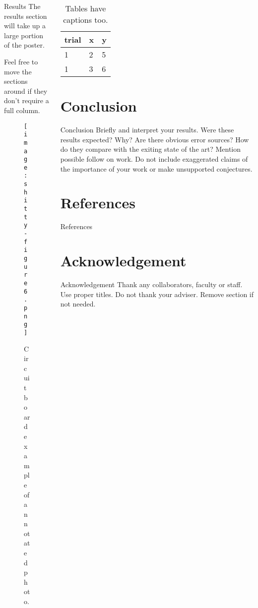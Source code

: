 \documentclass[pdf]{beamer}
\begin{document}
\begin{frame}[fragile]
\begin{columns}
\begin{column}{0.25\textwidth}
\begin{block}{Results}
The results section will take up a large portion of the poster.  

Feel free to move the sections around if they don’t require a full column. 

\begin{figure}
\texttt{[image: shitty-figure6.png]}
\caption{Circuit board example of annotated photo.}
\end{figure}
\end{block}
\end{column}

\begin{column}{0.25\textwidth}
\begin{table}
\caption{Tables have captions too.}
\begin{tabular}{lll}
\toprule
trial & x & y \\
\midrule
1 & 2 & 5 \\
1 & 3 & 6 \\
\bottomrule
\end{tabular}
\end{table}

\section{Conclusion}
\begin{block}{Conclusion}
Briefly and interpret your results. Were these results expected? Why? Are there obvious error sources? How do they compare with the exiting state of the art?   Mention possible follow on work.   Do not include exaggerated claims of the importance of your work or make unsupported conjectures. 
\end{block}

\section*{References}
\begin{block}{References}
\nocite{bingulac1994on, vidmar2018on}


\end{block}

\section*{Acknowledgement}
\begin{block}{Acknowledgement}
Thank any collaborators, faculty or staff. Use proper titles.  Do not thank your adviser. Remove section if not needed.
\end{block}
\end{column}

\end{columns}
\end{frame}
\end{document}
